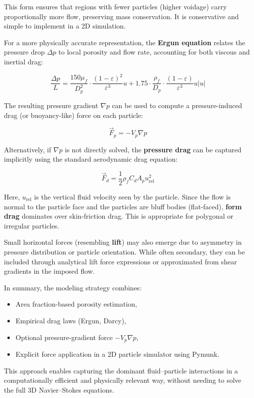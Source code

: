 This form ensures that regions with fewer particles (higher voidage) carry proportionally more flow, preserving mass conservation. It is conservative and simple to implement in a 2D simulation.

For a more physically accurate representation, the \textbf{Ergun equation} relates the pressure drop $\Delta p$ to local porosity and flow rate, accounting for both viscous and inertial drag:

\[
\frac{\Delta p}{L} = \frac{150 \mu_f}{D_p^2} \cdot \frac{(1 - \varepsilon)^2}{\varepsilon^3} u + 1.75 \cdot \frac{\rho_f}{D_p} \cdot \frac{(1 - \varepsilon)}{\varepsilon^3} u |u|
\]

The resulting pressure gradient $\nabla p$ can be used to compute a pressure-induced drag (or buoyancy-like) force on each particle:

\[
\vec{F}_p = -V_p \nabla p
\]

Alternatively, if $\nabla p$ is not directly solved, the \textbf{pressure drag} can be captured implicitly using the standard aerodynamic drag equation:

\[
\vec{F}_d = \frac{1}{2} \rho_f C_d A_p u_{\text{rel}}^2
\]

Here, $u_{\text{rel}}$ is the vertical fluid velocity seen by the particle. Since the flow is normal to the particle face and the particles are bluff bodies (flat-faced), \textbf{form drag} dominates over skin-friction drag. This is appropriate for polygonal or irregular particles.

Small horizontal forces (resembling \textbf{lift}) may also emerge due to asymmetry in pressure distribution or particle orientation. While often secondary, they can be included through analytical lift force expressions or approximated from shear gradients in the imposed flow.

\bigskip

In summary, the modeling strategy combines:
\begin{itemize}
    \item Area fraction-based porosity estimation,
    \item Empirical drag laws (Ergun, Darcy),
    \item Optional pressure-gradient force $-V_p \nabla p$,
    \item Explicit force application in a 2D particle simulator using Pymunk.
\end{itemize}

This approach enables capturing the dominant fluid--particle interactions in a computationally efficient and physically relevant way, without needing to solve the full 3D Navier--Stokes equations.
